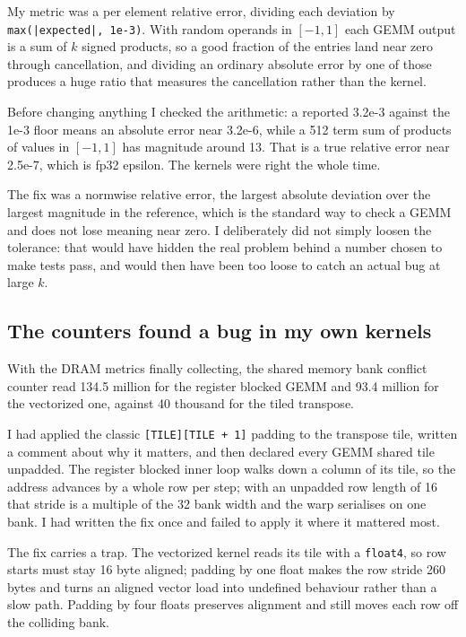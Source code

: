 ﻿\documentclass[11pt]{article}
\begin{document}
My metric was a per element relative error, dividing each deviation by
\texttt{max(|expected|, 1e-3)}. With random operands in $[-1, 1]$ each GEMM output
is a sum of $k$ signed products, so a good fraction of the entries land near zero
through cancellation, and dividing an ordinary absolute error by one of those
produces a huge ratio that measures the cancellation rather than the kernel.

Before changing anything I checked the arithmetic: a reported 3.2e-3 against the
1e-3 floor means an absolute error near 3.2e-6, while a 512 term sum of products
of values in $[-1, 1]$ has magnitude around 13. That is a true relative error near
2.5e-7, which is fp32 epsilon. The kernels were right the whole time.

The fix was a normwise relative error, the largest absolute deviation over the
largest magnitude in the reference, which is the standard way to check a GEMM and
does not lose meaning near zero. I deliberately did not simply loosen the
tolerance: that would have hidden the real problem behind a number chosen to make
tests pass, and would then have been too loose to catch an actual bug at large
$k$.

\subsection{The counters found a bug in my own kernels}

With the DRAM metrics finally collecting, the shared memory bank conflict counter
read 134.5 million for the register blocked GEMM and 93.4 million for the
vectorized one, against 40 thousand for the tiled transpose.

I had applied the classic \texttt{[TILE][TILE + 1]} padding to the transpose tile,
written a comment about why it matters, and then declared every GEMM shared tile
unpadded. The register blocked inner loop walks down a column of its tile, so the
address advances by a whole row per step; with an unpadded row length of 16 that
stride is a multiple of the 32 bank width and the warp serialises on one bank. I
had written the fix once and failed to apply it where it mattered most.

The fix carries a trap. The vectorized kernel reads its tile with a
\texttt{float4}, so row starts must stay 16 byte aligned; padding by one float
makes the row stride 260 bytes and turns an aligned vector load into undefined
behaviour rather than a slow path. Padding by four floats preserves alignment and
still moves each row off the colliding bank.
\end{document}
